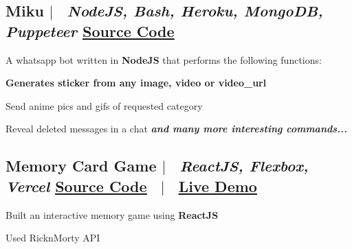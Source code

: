 \documentclass[11pt]{article}
\begin{document}
\subsection*{
  Miku 
  $|$
  \normalsize \normalfont \ \textit{NodeJS, Bash, Heroku, MongoDB, Puppeteer}
  \hfill 
  \normalsize \underline{\href{https://github.com/HARSH-SHETH/miku}{Source Code}}
}
  A whatsapp bot written in \textbf{NodeJS} that performs the following functions: 
  \begin{description}
    \setlength{\itemsep}{0em}
    \setlength{\itemindent}{2\parindent}
    \item[$\bullet$]{ \textbf{Generates sticker from any image, video or video\_url }}
    \item[$\bullet$]{ Send anime pics and gifs of requested category}
    \item[$\bullet$]{ Reveal deleted messages in a chat}
    \emph{\textbf{and many more interesting commands...}}
  \end{description}

\subsection*{
  Memory Card Game 
  $|$ 
  \normalsize \normalfont \ \textit{ReactJS, Flexbox, Vercel }
  \hfill
  \normalsize \underline{\href{https://github.com/harsh-sheth/memory_card_game}{Source Code}}
  \ $|$ \ 
  \normalsize \underline{\href{https://harsh-sheth.github.io/memory_card_game}{Live Demo}}
}
  \begin{description}
    \setlength{\itemsep}{0em}
    \setlength{\itemindent}{2\parindent}
    \item[$\bullet$]{Built an interactive memory game using \textbf{ReactJS}}
    \item[$\bullet$]{Used RicknMorty API}
  \end{description}
\end{document}
